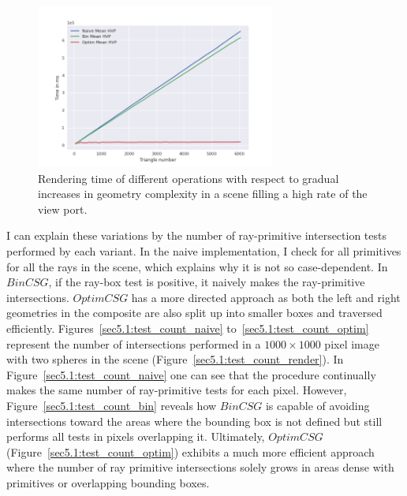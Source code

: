 \documentclass[a4paper,11pt,oneside]{article}
\begin{document}
\begin{figure}[H]
	\centering
	\includegraphics[width=0.7\textwidth]{section5/plots/geo_complexity_hvp.png}
	\caption{Rendering time of different operations with respect to gradual increases in geometry complexity in a scene filling a high rate of the view port.}
	\label{sec5.1:geo_complexity_hvp}
\end{figure}


I can explain these variations by the number of ray-primitive intersection tests performed by each variant. In the naive implementation, I check for all primitives for all the rays in the scene, which explains why it is not so case-dependent. In $BinCSG$, if the ray-box test is positive, it naively makes the ray-primitive intersections. $OptimCSG$ has a more directed approach as both the left and right geometries in the composite are also split up into smaller boxes and traversed efficiently. Figures~\ref{sec5.1:test_count_naive} to~\ref{sec5.1:test_count_optim} represent the number of intersections performed in a $1000 \times 1000$ pixel image with two spheres in the scene (Figure~\ref{sec5.1:test_count_render}). In Figure~\ref{sec5.1:test_count_naive} one can see that the procedure continually makes the same number of ray-primitive tests for each pixel. However, Figure~\ref{sec5.1:test_count_bin} reveals how $BinCSG$ is capable of avoiding intersections toward the areas where the bounding box is not defined but still performs all tests in pixels overlapping it. Ultimately, $OptimCSG$ (Figure~\ref{sec5.1:test_count_optim}) exhibits a much more efficient approach where the number of ray primitive intersections solely grows in areas dense with primitives or overlapping bounding boxes.
\end{document}
